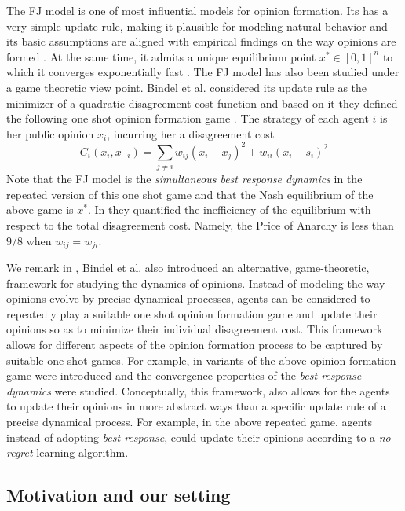 The FJ model is one of most influential models for opinion formation.  Its has
a very simple update rule, making it plausible for modeling natural
behavior and its basic assumptions are aligned with empirical findings on the
way opinions are formed \cite{AFH05,K47}.  At the same time, it admits a unique
equilibrium point $x^* \in [0,1]^n$ to which it converges exponentially fast
\cite{GS14}.  The FJ model has also been studied under a game theoretic view
point.  Bindel et al. considered its update rule as the minimizer of a
quadratic disagreement cost function and based on it they defined the following
one shot opinion formation game \cite{BKO11}. The strategy of each agent $i$ is
her public opinion $x_i$, incurring her a disagreement cost
%
\begin{equation}\label{eq:BKO_cost}
  C_i(x_i,x_{-i})= \sum_{j \neq i}w_{ij} (x_i-x_j)^2 + w_{ii}(x_i-s_i)^2
\end{equation}
%
Note that the FJ model is the \emph{simultaneous best response dynamics} in the
repeated version of this one shot game and that the Nash equilibrium of the
above game is $x^*$. In \cite{BKO11} they quantified the inefficiency of the
equilibrium with respect to the total disagreement cost. Namely, the Price of
Anarchy is less than $9/8$ when $w_{ij}=w_{ji}$.

We remark in \cite{BKO11}, Bindel et al. also introduced an alternative,
game-theoretic, framework for studying the dynamics of opinions.  Instead of
modeling the way opinions evolve by precise dynamical processes, agents can be
considered to repeatedly play a suitable one shot opinion formation game and
update their opinions so as to minimize their individual disagreement cost.
This framework allows for different aspects of the opinion formation process to
be captured by suitable one shot games.  For example, in \cite{BGM13,EFHS17}
variants of the above opinion formation game were introduced and the
convergence properties of the \emph{best response dynamics} were studied.
Conceptually, this framework, also allows for the agents to update their
opinions in more abstract ways than a specific update rule of a precise
dynamical process.  For example, in the above repeated game, agents instead of
adopting \emph{best response}, could update their opinions according to a
\emph{no-regret} learning algorithm.

\subsection{Motivation and our setting}


